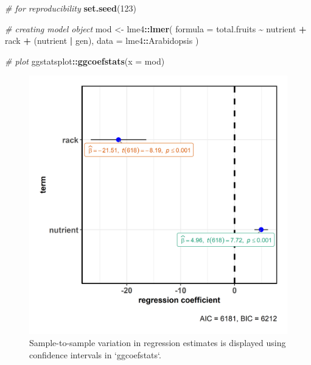 \documentclass[
]{article}
\newenvironment{Shaded}{\begin{snugshade}}{\end{snugshade}}
\newcommand{\CommentTok}[1]{\textcolor[rgb]{0.56,0.35,0.01}{\textit{#1}}}
\newcommand{\DataTypeTok}[1]{\textcolor[rgb]{0.13,0.29,0.53}{#1}}
\newcommand{\DecValTok}[1]{\textcolor[rgb]{0.00,0.00,0.81}{#1}}
\newcommand{\KeywordTok}[1]{\textcolor[rgb]{0.13,0.29,0.53}{\textbf{#1}}}
\newcommand{\NormalTok}[1]{#1}
\newcommand{\OperatorTok}[1]{\textcolor[rgb]{0.81,0.36,0.00}{\textbf{#1}}}
\newcommand{\StringTok}[1]{\textcolor[rgb]{0.31,0.60,0.02}{#1}}
\begin{document}
\begin{Shaded}
\begin{Highlighting}[]
\CommentTok{\# for reproducibility}
\KeywordTok{set.seed}\NormalTok{(}\DecValTok{123}\NormalTok{)}

\CommentTok{\# creating model object}
\NormalTok{mod <{-}}\StringTok{ }\NormalTok{lme4}\OperatorTok{::}\KeywordTok{lmer}\NormalTok{(}
  \DataTypeTok{formula =}\NormalTok{ total.fruits }\OperatorTok{\textasciitilde{}}\StringTok{ }\NormalTok{nutrient }\OperatorTok{+}\StringTok{ }\NormalTok{rack }\OperatorTok{+}\StringTok{ }\NormalTok{(nutrient }\OperatorTok{|}\StringTok{ }\NormalTok{gen),}
  \DataTypeTok{data =}\NormalTok{ lme4}\OperatorTok{::}\NormalTok{Arabidopsis}
\NormalTok{)}

\CommentTok{\# plot}
\NormalTok{ggstatsplot}\OperatorTok{::}\KeywordTok{ggcoefstats}\NormalTok{(}\DataTypeTok{x =}\NormalTok{ mod)}
\end{Highlighting}
\end{Shaded}

\begin{figure}[H]
\includegraphics[width=1\linewidth]{./figures/paper-fig6-1} \caption{Sample-to-sample variation in regression estimates is displayed using confidence intervals in `ggcoefstats`.}\label{fig:fig6}
\end{figure}
\end{document}

